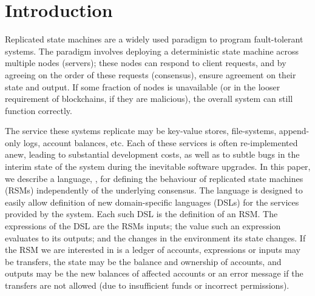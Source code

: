 \section{Introduction}
\label{s:introduction}







Replicated state machines are a widely used paradigm to program fault-tolerant
systems. The paradigm involves deploying a deterministic state machine across
multiple nodes (servers); these nodes can respond to client requests, and by
agreeing on the order of these requests (consensus), ensure agreement on their
state and output. If some fraction of nodes is unavailable (or in the looser
requirement of blockchains, if they are malicious), the overall system can
still function correctly.

The service these systems replicate may be key-value stores, file-systems,
append-only logs, account balances, etc. Each of these
services is often re-implemented anew, leading to substantial development
costs, as well as to subtle bugs in the interim state of the system during the
inevitable software upgrades. In this paper, we describe a language, \rad, for
defining the behaviour of replicated state machines (RSMs) independently of the
underlying consensus. The language is designed to easily allow definition of
new domain-specific languages (DSLs) for the services provided by the system.
Each such DSL is the definition of an RSM. The expressions of the DSL
are the RSMs inputs; the value such an expression evaluates to its outputs; and
the changes in the environment its state changes. If the RSM we are interested
in is a ledger of accounts, expressions or inputs may be transfers, the
state may be the balance and ownership of accounts, and outputs may be the new
balances of affected accounts or an error message if the transfers are not
allowed (due to insufficient funds or incorrect permissions).

